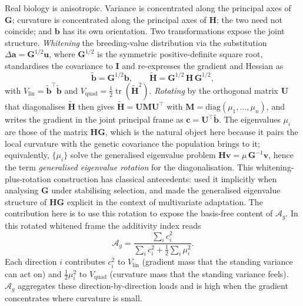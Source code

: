 \documentclass[9pt,twocolumn,twoside,lineno]{gsajnl}
\newcommand{\vect}[1]{\boldsymbol{#1}}
\newcommand{\mat}[1]{\mathbf{#1}}
\newcommand{\tr}{\ensuremath{\operatorname{tr}}\xspace}
\newcommand{\Ag}{\ensuremath{\mathcal{A}_{g}}\xspace}
\newcommand{\Vlin}{\ensuremath{V_{\text{lin}}}\xspace}
\newcommand{\Vquad}{\ensuremath{V_{\text{quad}}}\xspace}
\begin{document}
Real biology is anisotropic. Variance is concentrated along the principal axes of $\mat{G}$; curvature is concentrated along the principal axes of $\mat{H}$; the two need not coincide; and $\vect{b}$ has its own orientation. Two transformations expose the joint structure. \emph{Whitening} the breeding-value distribution via the substitution $\Delta\vect{a} = \mat{G}^{1/2}\vect{u}$, where $\mat{G}^{1/2}$ is the symmetric positive-definite square root, standardises the covariance to $\mat{I}$ and re-expresses the gradient and Hessian as
\begin{equation}
\tilde{\vect{b}} = \mat{G}^{1/2}\vect{b}, \qquad \tilde{\mat{H}} = \mat{G}^{1/2}\,\mat{H}\,\mat{G}^{1/2},
\label{eq:whitened}
\end{equation}
with $\Vlin = \tilde{\vect{b}}^{\top}\tilde{\vect{b}}$ and $\Vquad = \tfrac{1}{2}\tr(\tilde{\mat{H}}^{2})$. \emph{Rotating} by the orthogonal matrix $\mat{U}$ that diagonalises $\tilde{\mat{H}}$ then gives $\tilde{\mat{H}} = \mat{U}\mat{M}\mat{U}^{\top}$ with $\mat{M}=\mathrm{diag}(\mu_1,\ldots,\mu_n)$, and writes the gradient in the joint principal frame as $\vect{c} = \mat{U}^{\top}\tilde{\vect{b}}$. The eigenvalues $\mu_i$ are those of the matrix $\mat{H}\mat{G}$, which is the natural object here because it pairs the local curvature with the genetic covariance the population brings to it; equivalently, $\{\mu_i\}$ solve the generalised eigenvalue problem $\mat{H}\vect{v} = \mu\,\mat{G}^{-1}\vect{v}$, hence the term \emph{generalised eigenvalue rotation} for the diagonalisation. This whitening-plus-rotation construction has classical antecedents: \citet{Lande1980} used it implicitly when analysing $\mat{G}$ under stabilising selection, and \citet{MartinLenormand2006} made the generalised eigenvalue structure of $\mat{H}\mat{G}$ explicit in the context of multivariate adaptation. The contribution here is to use this rotation to expose the basis-free content of \Ag. In this rotated whitened frame the additivity index reads
\begin{equation}
\Ag = \frac{\sum_i c_i^2}{\sum_i c_i^2 + \tfrac{1}{2}\sum_i \mu_i^2}.
\label{eq:Ag_rotated}
\end{equation}
Each direction $i$ contributes $c_i^2$ to $\Vlin$ (gradient mass that the standing variance can act on) and $\tfrac{1}{2}\mu_i^2$ to $\Vquad$ (curvature mass that the standing variance feels). \Ag aggregates these direction-by-direction loads and is high when the gradient concentrates where curvature is small.
\end{document}
